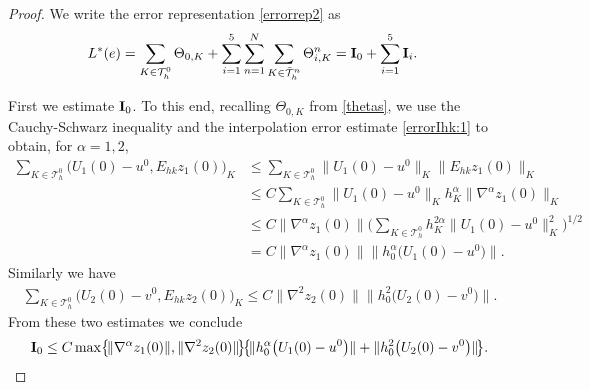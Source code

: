 \documentclass{amsart}
\numberwithin{equation}{section}
\theoremstyle{definition}
\begin{document}
\begin{proof}
We write the error representation \eqref{errorrep2} as
\begin{equation}   \label{apost:2:eq0}
  \begin{split}
    L^*(e)
    &=\sum_{K\in{\mathcal T}_h^0}\Theta_{0,K}
     +\sum_{i=1}^5\sum_{n=1}^N \sum_{K\in\bar{\mathcal T}_h^n}
      \Theta_{i,K}^n
    ={\rm{\bf I}}_0+\sum_{i=1}^5 {\rm{\bf I}}_i.
  \end{split}
\end{equation}

First we estimate ${\rm{\bf I}}_0$. To this end, recalling $\Theta_{0,K}$
from \eqref{thetas}, we use the Cauchy-Schwarz inequality and the interpolation error estimate \eqref{errorIhk:1} to obtain, for $\alpha=1,2$,
\begin{equation*}
  \begin{split}
    \sum_{K\in{\mathcal T}_h^0}\big(U_1(0)-u^0,E_{hk}z_1(0)\big)_K
    &\le \sum_{K\in{\mathcal T}_h^0}\|U_1(0)-u^0\|_K \|E_{hk}z_1(0)\|_K\\
    &\le C\sum_{K\in{\mathcal T}_h^0}\|U_1(0)-u^0\|_K 
      h_K^\alpha\|\nabla^\alpha z_1(0)\|_K\\
    &\le C\|\nabla^\alpha z_1(0)\|
      \Big(
      \sum_{K\in{\mathcal T}_h^0}h_K^{2\alpha}\|U_1(0)-u^0\|_K^2
     \Big)^{1/2}\\
    &=C\|\nabla^\alpha z_1(0)\| \| h_0^\alpha \big(U_1(0)-u^0\big)\|.
  \end{split}
\end{equation*}
Similarly we have
\begin{equation*}
  \begin{split}
    \sum_{K\in{\mathcal T}_h^0}\big(U_2(0)-v^0,E_{hk}z_2(0)\big)_K
    \le C\|\nabla^{2} z_2(0)\| \|h_0^{2}\big(U_2(0)-v^0\big)\|.
  \end{split}
\end{equation*}
From these two estimates we conclude
\begin{equation}   \label{aposteriori2:est1}
  \begin{split}
    {\rm{\bf I}}_0  
    \le C \max \!\big\{\! \|\nabla^\alpha z_1(0)\|,\|\nabla^{2}z_2(0)\| \! \big\}\!
    \big\{\!
     \|h_0^\alpha \big(U_1(0)-u^0\big)\|+\|h_0^{2}\big(U_2(0)-v^0\big)\| \!
    \big\}.
  \end{split}
\end{equation}


\end{proof}
\end{document}
